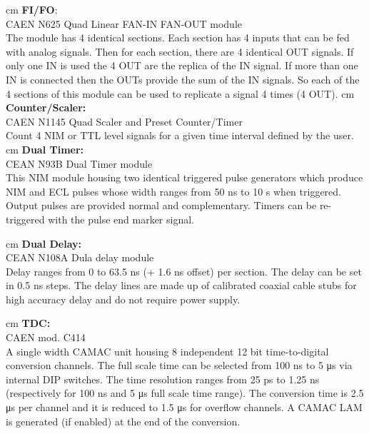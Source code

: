 	 cm
	\textbf{FI/FO}:\\ CAEN N625 Quad Linear FAN-IN FAN-OUT module\\
	The module has 4 identical sections. Each section has 4 inputs that can be fed with analog
    signals. Then for each section, there are 4 identical OUT signals. If only one IN is used the
    4 OUT are the replica of the IN signal. If more than one IN is connected then the OUTs provide
    the sum of the IN signals. So each of the 4 sections of this module can be used to replicate 
    a signal 4 times (4 OUT).
	 cm
	\textbf{Counter/Scaler:}\\ CAEN N1145 Quad Scaler and Preset Counter/Timer\\
	Count 4 NIM or TTL level signals for a given time interval deﬁned by the user.
    	 cm
	\textbf{Dual Timer:}\\ CEAN N93B Dual Timer module\\
	This NIM module housing two identical triggered pulse generators which produce NIM and ECL pulses whose width ranges from 50 ns to 10 s when 	triggered. Output pulses are provided normal and complementary. Timers can be re-triggered with the pulse end marker signal.
	
	 cm
	\textbf{Dual Delay:} \\CEAN N108A Dula delay module\\
	Delay ranges from 0 to 63.5 ns (+ 1.6 ns offset) per section. The delay can be set in 0.5 ns steps. The delay lines are made up of calibrated coaxial cable stubs for high accuracy delay and do not require power supply.
	
	 cm
	\textbf{TDC:} \\CAEN mod. C414\\
	A single width CAMAC unit housing 8 independent 12 bit time-to-digital conversion channels. The full scale time can be selected from 100 ns to 5 μs via internal DIP switches. The time resolution ranges from 25 ps to 1.25 ns (respectively for 100 ns and 5 μs full scale time range). The conversion time is 2.5 μs per channel and it is reduced to 1.5 μs for overflow channels. A CAMAC LAM is generated (if enabled) at the end of the conversion.
